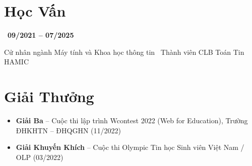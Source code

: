 \documentclass[a4paper,9.5pt]{article}
\begin{document}
\section{Học Vấn}
 \textbar\ \textbf{09/2021 -- 07/2025}\par\nopagebreak
\noindent Cử nhân ngành Máy tính và Khoa học thông tin \textbar\ Thành viên CLB Toán Tin HAMIC\par

\section{Giải Thưởng}
\begin{itemize}
    \item \textbf{Giải Ba} -- Cuộc thi lập trình Wcontest 2022 (Web for Education), Trường ĐHKHTN -- ĐHQGHN (11/2022)
    \item \textbf{Giải Khuyến Khích} -- Cuộc thi Olympic Tin học Sinh viên Việt Nam / OLP (03/2022)
\end{itemize}
\end{document}
